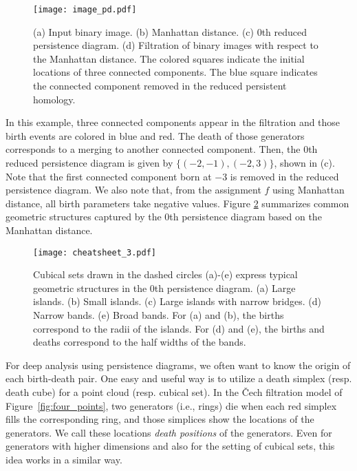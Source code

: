 \documentclass[smallextended]{svjour3}
\begin{document}
\begin{figure}[htbp]
  \centering
  \texttt{[image: image\_pd.pdf]}
  \caption{
  (a) Input binary image. (b) Manhattan distance. (c) $0$th reduced persistence diagram. (d) Filtration of binary images with respect to the Manhattan distance. 
  The colored squares indicate the initial locations of three connected components.
The blue square indicates the connected component removed in the reduced persistent homology.}
  \label{fig:ph_binary_image}
\end{figure}

In this example, three connected components appear in the filtration and those birth events are colored in blue and red. The death of those generators corresponds to a merging to another connected component. Then, the 0th reduced persistence diagram is given by $\{(-2, -1), (-2, 3)\}$,  shown in (c). Note that the first connected component born at $-3$ is removed in the reduced persistence diagram. 
We also note that, from the assignment $f$ using Manhattan distance, all birth parameters take negative values. Figure \ref{fig:pd_binary_image_cheatsheet} summarizes common geometric structures captured by the 0th persistence diagram based on the Manhattan distance. 



\begin{figure}[htbp]
  \centering
  \texttt{[image: cheatsheet\_3.pdf]}  
  \caption{Cubical sets drawn in the dashed circles (a)-(e) express typical geometric structures in the $0$th persistence diagram. (a) Large islands. (b) Small islands. (c) Large islands with narrow bridges. (d) Narrow bands. (e) Broad bands. For (a) and (b), the births correspond to the radii of the islands. For (d) and (e), the births and deaths correspond to the half widths of the bands. }
  \label{fig:pd_binary_image_cheatsheet}
\end{figure}


For deep analysis using persistence diagrams, we often want to know the origin of each birth-death pair. One easy and useful way is to utilize a death simplex (resp. death cube) for a point cloud (resp. cubical set).  In the {\v C}ech filtration model of Figure~\ref{fig:four_points}, two generators (i.e., rings) die when each red simplex fills the corresponding ring, and those simplices show the locations of the generators. We call these locations \emph{death positions} of the generators. Even for generators with higher dimensions and also for the setting of cubical sets, this idea works in a similar way. 
\end{document}
